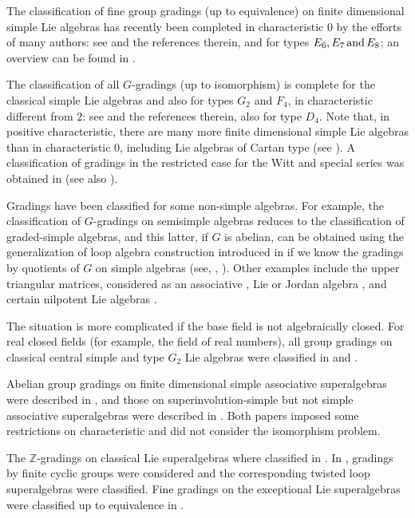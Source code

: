 The classification of fine group gradings (up to equivalence) on finite dimensional simple Lie algebras has recently been completed in characteristic $0$ by the efforts of many authors: see \cite[Chapters 3–6]{livromicha} and the references therein, \cite{E14} and \cite{YuExc} for types $E_6, E_7 \,\text{and}\, E_8$; an overview can be found in \cite{MR3601079}.    

The classification of all $G$-gradings (up to isomorphism) is complete for the classical simple Lie algebras and also for types $G_2$ and $F_4$, in characteristic different from $2$: see \cite[Chapters 3–6]{livromicha} and the references therein, also \cite{EK_d4} for type $D_4$. 
Note that, in positive characteristic, there are many more finite dimensional simple Lie algebras than in characteristic $0$, including Lie algebras of Cartan type (see \cite{MR2059133,MR2573283,MR3025870}). 
A classification of gradings in the restricted case for the Witt and special series was obtained in \cite{MR2878812} (see also \cite[Chapter 7]{livromicha}). 


Gradings have been classified for some non-simple algebras. 
For example, the classification of $G$-gradings on semisimple algebras reduces to the classification of graded-simple algebras, and this latter, if $G$ is abelian, can be obtained using the generalization of loop algebra construction introduced in \cite{MR2418198} if we know the gradings by quotients of $G$ on simple algebras (see, \eg, \cite{MR3857543}). 
Other examples include the upper triangular matrices, considered as an associative \cite{MR2322777}, Lie \cite{MR3614154} or Jordan algebra \cite{MR3697052}, and certain nilpotent Lie algebras \cite{MR3413670}. 

The situation is more complicated if the base field is not algebraically closed. 
For real closed fields (for example, the field of real numbers), all group gradings on classical central simple and type $G_2$ Lie algebras were classified in \cite{paper-adrian} and \cite{MR3841529}. 

Abelian group gradings on finite dimensional simple associative superalgebras were described in \cite{BS}, and those on superinvolution-simple but not simple associative superalgebras were described in \cite{BTT}. 
Both papers imposed some restrictions on characteristic and did not consider the isomorphism problem. 

The $\mathbb{Z}$-gradings on classical Lie superalgebras where classified in \cite{kacZ}. 
In \cite{serganova}, gradings by finite cyclic groups were considered and the corresponding twisted loop superalgebras were classified. 
Fine gradings on the exceptional Lie superalgebras were classified up to equivalence in \cite{artigoelduque}.

